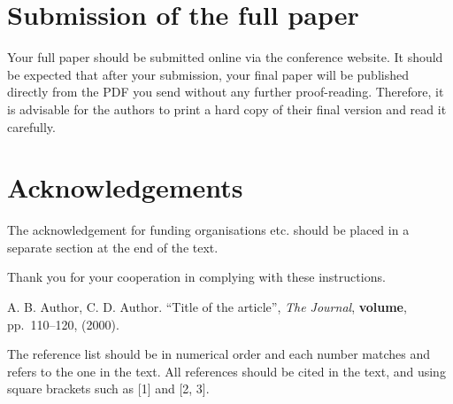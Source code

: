 \documentclass[12pt]{IET02}
\begin{document}
\section{Submission of the full paper}

Your full paper should be submitted online via the conference website. It
should be expected that after your submission, your final paper will be
published directly from the PDF you send without any further proof-reading.
Therefore, it is advisable for the authors to print a hard copy of their
final version and read it carefully.

\section*{Acknowledgements}

The acknowledgement for funding organisations etc. should be placed in a
separate section at the end of the text.

Thank you for your cooperation in complying with these instructions.

\begin{thebibliography}{9}
\vspace{1pc}

\bibitem{}A. B. Author, C. D. Author. ``Title of the article'',
\textit{The Journal}, \textbf{volume}, pp.~110--120, (2000).\vspace{.4pc}
\end{thebibliography}

The reference list should be in numerical order and each number matches and
refers to the one in the text. All references should be cited in the text,
and using square brackets such as [1] and [2, 3].
\end{document}
